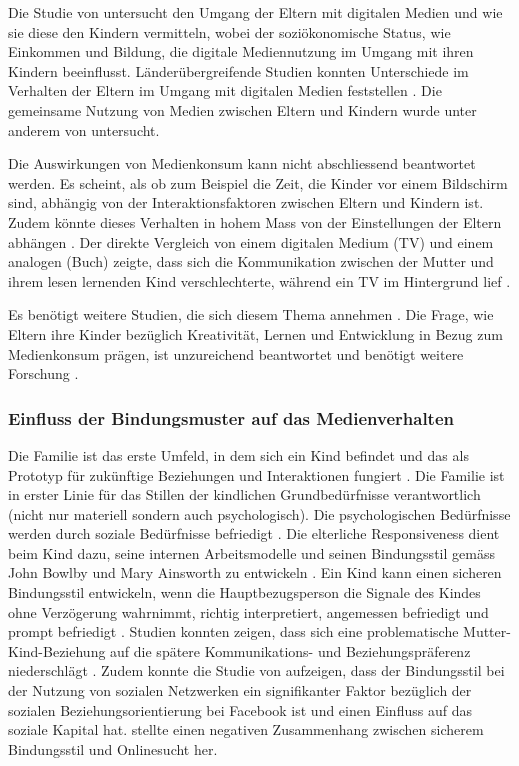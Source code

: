 Die Studie von  untersucht den Umgang der Eltern mit digitalen Medien und wie sie diese den Kindern vermitteln, wobei der soziökonomische Status, wie Einkommen und Bildung, die digitale Mediennutzung im Umgang mit ihren Kindern beeinflusst. Länderübergreifende Studien konnten Unterschiede im Verhalten der Eltern im Umgang mit digitalen Medien feststellen \cite{Helsper2013}. Die gemeinsame Nutzung von Medien zwischen Eltern und Kindern wurde unter anderem von  untersucht. 

Die Auswirkungen von Medienkonsum kann nicht abschliessend beantwortet werden. Es scheint, als ob zum Beispiel die Zeit, die Kinder vor einem Bildschirm sind, abhängig von der Interaktionsfaktoren zwischen Eltern und Kindern ist. Zudem könnte dieses Verhalten in hohem Mass von der Einstellungen der Eltern abhängen \cite{Lauricella2015}. Der direkte Vergleich von einem digitalen Medium (TV) und einem analogen (Buch) zeigte, dass sich die Kommunikation zwischen der Mutter und ihrem lesen lernenden Kind verschlechterte, während ein TV im Hintergrund lief \cite{Nathanson2011}.

Es benötigt weitere Studien, die sich diesem Thema annehmen \cite{Wartella2016}. Die Frage, wie Eltern ihre Kinder bezüglich Kreativität, Lernen und Entwicklung in Bezug zum Medienkonsum prägen, ist unzureichend beantwortet und benötigt weitere Forschung \cite{AmericanAcademyofPediatrics2011,Troseth2016}. 

\subsubsection{Einfluss der Bindungsmuster auf das Medienverhalten} 
Die Familie ist das erste Umfeld, in dem sich ein Kind befindet  und das als Prototyp für zukünftige Beziehungen und Interaktionen fungiert \cite{Floros2013}. Die Familie ist in erster Linie für das Stillen der kindlichen Grundbedürfnisse verantwortlich (nicht nur materiell sondern auch psychologisch). Die psychologischen Bedürfnisse werden durch soziale Bedürfnisse befriedigt \cite{Hazan1994}. Die elterliche Responsiveness dient beim Kind dazu, seine internen Arbeitsmodelle und seinen Bindungsstil gemäss John Bowlby und Mary Ainsworth zu entwickeln \cite{Bretherton1999}. Ein Kind kann einen sicheren Bindungsstil entwickeln, wenn die Hauptbezugsperson die Signale des Kindes ohne Verzögerung wahrnimmt, richtig interpretiert, angemessen befriedigt und prompt befriedigt \cite{Bell1972}. Studien konnten zeigen, dass sich eine problematische Mutter-Kind-Beziehung auf die spätere Kommunikations- und Beziehungspräferenz niederschlägt \cite{Szwedo2011}. Zudem konnte die Studie von  aufzeigen, dass der Bindungsstil bei der Nutzung von sozialen Netzwerken ein signifikanter Faktor bezüglich der sozialen Beziehungsorientierung bei Facebook ist und einen Einfluss auf das soziale Kapital hat.  stellte einen negativen Zusammenhang zwischen sicherem Bindungsstil und Onlinesucht her.  

